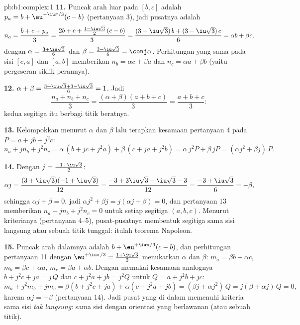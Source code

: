 \begin{solution}{pb:b1:complex:1}
\textbf{11.} Puncak arah luar pada $[b, c]$ adalah $p_a = b +
\eu^{-\iu\pi/3}(c - b)$ (pertanyaan 3), jadi pusatnya adalah
\[
n_a = \frac{b + c + p_a}3
= \frac{2b + c + \frac{1 - \iu\sqrt3}2\,(c - b)}3
= \frac{(3 + \iu\sqrt3)\,b + (3 - \iu\sqrt3)\,c}6
= \alpha b + \beta c ,
\]
dengan $\alpha = \frac{3 + \iu\sqrt3}6$ dan $\beta = \frac{3 -
\iu\sqrt3}6 = \conj\alpha$. Perhitungan yang sama pada sisi
$[c, a]$ dan $[a, b]$ memberikan $n_b = \alpha c + \beta a$ dan $n_c =
\alpha a + \beta b$ (yaitu pergeseran siklik perannya).

\textbf{12.} $\alpha + \beta = \frac{3 + \iu\sqrt3 + 3 -
\iu\sqrt3}6 = 1$. Jadi
\[
\frac{n_a + n_b + n_c}3
= \frac{(\alpha + \beta)(a + b + c)}3 = \frac{a + b + c}3 :
\]
kedua segitiga itu berbagi titik beratnya.

\textbf{13.} Kelompokkan menurut $\alpha$ dan $\beta$ lalu terapkan kesamaan
pertanyaan 4 pada $P = a + jb + j^2c$:
\[
n_a + j n_b + j^2 n_c
= \alpha\,(b + jc + j^2 a) + \beta\,(c + ja + j^2 b)
= \alpha\,j^2 P + \beta\,j P
= (\alpha j^2 + \beta j)\,P .
\]

\textbf{14.} Dengan $j = \frac{-1 + \iu\sqrt3}2$:
\[
\alpha j = \frac{(3 + \iu\sqrt3)(-1 + \iu\sqrt3)}{12}
= \frac{-3 + 3\iu\sqrt3 - \iu\sqrt3 - 3}{12}
= \frac{-3 + \iu\sqrt3}6 = -\beta ,
\]
sehingga $\alpha j + \beta = 0$, jadi $\alpha j^2 + \beta j = j(\alpha j
+ \beta) = 0$, dan pertanyaan 13 memberikan $n_a + jn_b + j^2n_c = 0$ untuk
setiap segitiga $(a, b, c)$. Menurut kriterianya (pertanyaan 4--5),
pusat-pusatnya membentuk segitiga sama sisi langsung atau sebuah titik tunggal:
itulah teorema Napoleon.

\textbf{15.} Puncak arah dalamnya adalah $b + \eu^{+\iu\pi/3}(c - b)$, dan
perhitungan pertanyaan 11 dengan $\eu^{+\iu\pi/3} = \frac{1 +
\iu\sqrt3}2$ menukarkan $\alpha$ dan $\beta$: $m_a = \beta b + \alpha
c$, $m_b = \beta c + \alpha a$, $m_c = \beta a + \alpha b$. Dengan memakai
kesamaan analognya $b + j^2c + ja = j\,Q$ dan $c + j^2a + jb
= j^2 Q$ untuk $Q = a + j^2b + jc$:
\[
m_a + j^2 m_b + j m_c
= \beta(b + j^2 c + ja) + \alpha(c + j^2 a + jb)
= (\beta j + \alpha j^2)\, Q = j(\beta + \alpha j)\,Q = 0 ,
\]
karena $\alpha j = -\beta$ (pertanyaan 14). Jadi pusat yang di dalam
memenuhi kriteria sama sisi \emph{tak langsung}: sama sisi dengan
orientasi yang berlawanan (atau sebuah titik).


\end{solution}
